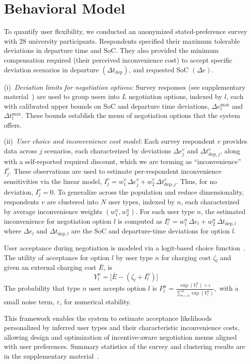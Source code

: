 \section{Behavioral Model}\label{sec:behavior}
To quantify user flexibility, we conducted an anonymized stated-preference survey with 28 university participants. Respondents specified their maximum tolerable deviations in departure time and SoC. They also provided the minimum compensation required (their perceived inconvenience cost) to accept specific deviation scenarios in departure $(\Delta t_{\mathrm{dep}})$, and requested SoC $(\Delta e)$.


\noindent
(i)~\textit{Deviation limits for negotiation options:}
Survey responses (see supplementary material~\cite{sen2026consent}) are used to group users into \(L\) negotiation options, indexed by $l$,  each with calibrated upper bounds on SoC and departure time deviations,  \(\Delta e^{\max}_l\) and \(\Delta t^{\max}_l\). These bounds establish the menu of negotiation options that the system offers. 

\noindent
(ii)~\textit{User choice and inconvenience cost model:}  
Each survey respondent \(v\) provides data across $j$ scenarios, each characterized by deviations \(\Delta e^{v}_j\) and \(\Delta t^{v}_{\mathrm{dep}, j}\), along with a self-reported required discount, which we are terming as ``inconvenience'' \(I^{v}_j\). These observations are used to estimate per-respondent inconvenience sensitivities via the linear model, 
$
I^{v}_j = w^{v}_1\, \Delta e^{v}_j + w^{v}_2\, \Delta t^{v}_{\mathrm{dep}, j}.
$
Thus, for no deviation, $I^v_j=0$.
To generalize across the population and reduce dimensionality, respondents \(v\) are clustered into \(N\) user types, indexed by \(n\), each characterized by average inconvenience weights \((w^{n}_1, w^{n}_2)\).
For each user type \(n\), the estimated inconvenience for negotiation option \(l\) is computed as
$I^{n}_l = w^{n}_1\, \Delta e_{l} + w^{n}_2\, \Delta t_{\mathrm{dep}, l}$
where \(\Delta e_{l}\) and \(\Delta t_{\mathrm{dep}, l}\) are the SoC and departure-time deviations for option \(l\).


User acceptance during negotiation is modeled via a logit-based choice function~\cite{bae2021inducing}. The utility of acceptance for option \(l\) by user type \(n\) for charging cost $\zeta_l$ and given an external charging cost $\bar{E}$, is
\begin{equation}\label{eq:user_satisfaction}
Y^{n}_l = \Big[ \bar{E} - (\zeta_l + I^{n}_l) \Big]
\end{equation} 
The probability that type \(n\) user accepts option \(l\) is
$
P^{n}_l = \frac{\exp(Y^{n}_l) + \varepsilon}{\sum_{l=0}^L \exp(Y^{n}_l)},
$
with a small noise term, \(\varepsilon\), for numerical stability.

This framework enables the system to estimate acceptance likelihoods personalized by inferred user types and their characteristic inconvenience costs, allowing design and optimization of incentive-aware negotiation menus aligned with user preferences. Summary statistics of the survey and clustering results are in the supplementary material~\cite{sen2026consent}.
